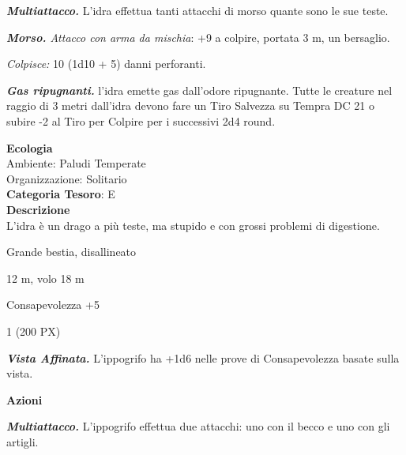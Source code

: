 \begin{multicols}{2}
{\emph{\textbf{Multiattacco.}} L'idra effettua tanti attacchi di morso quante sono le sue teste.

\emph{\textbf{Morso.} Attacco con arma da mischia}: +9 a colpire, portata 3 m, un bersaglio.

\emph{Colpisce:} 10 (1d10 + 5) danni perforanti.

\emph{\textbf{Gas ripugnanti.}} l'idra emette gas dall'odore ripugnante. Tutte le creature nel raggio di 3 metri dall'idra devono fare un Tiro Salvezza su Tempra DC 21 o subire -2 al Tiro per Colpire per i successivi 2d4 round.

\textbf{Ecologia}\\
Ambiente: Paludi Temperate\\
Organizzazione: Solitario\\
\textbf{Categoria Tesoro}: E\\
\textbf{Descrizione}\\
L'idra è un drago a più teste, ma stupido e con grossi problemi di digestione.


\begin{description}[noitemsep, topsep=0pt, parsep=0pt, partopsep=0pt, itemsep=1pt, leftmargin=2.35cm,  labelwidth=2.2cm, itemindent=0cm, listparindent=0pt] %
\setlength{\baselineskip}{10pt}
\item[\textbf{Taglia/Tipo}] Grande bestia, disallineato
\item[\textbf{Caratt.}] 
\item[\textbf{Punti Ferita}] 
\item[\textbf{Movimento}] 12 m, volo 18 m
\item[\textbf{Tiri Salvez.}] 
\item[\textbf{Comp.}] Consapevolezza +5
\item[\textbf{Sfida}] 1 (200 PX)
\end{description}
\smallskip

\emph{\textbf{Vista Affinata.}} L'ippogrifo ha +1d6 nelle prove di Consapevolezza basate sulla vista.

\textbf{Azioni}

\emph{\textbf{Multiattacco.}} L'ippogrifo effettua due attacchi: uno con il becco e uno con gli artigli.

}
\end{multicols}
